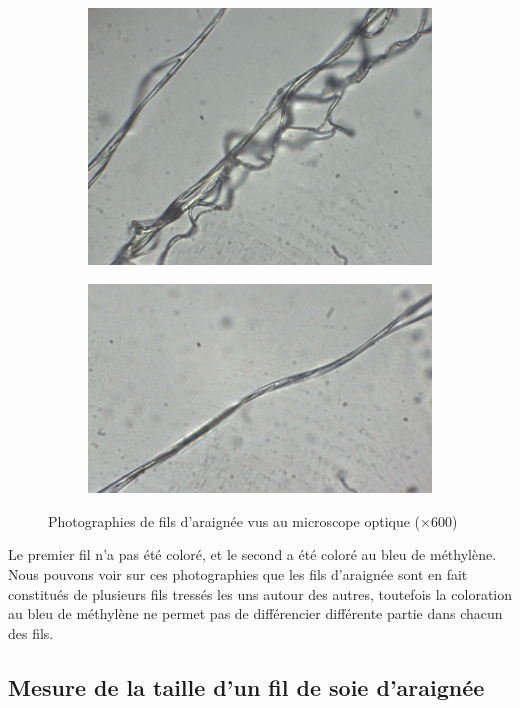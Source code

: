 	\begin{figure}[htb!]
		\centering
		\begin{subfigure}{.5\textwidth}
			\centering
			\includegraphics[width=0.8\linewidth]{../img/vibrations/FilMicroscopeA}
			\caption{}
			\label{fig:FilMicroscopeA}
		\end{subfigure}%
		\begin{subfigure}{.5\textwidth}
			\centering
			\includegraphics[width=0.8\linewidth]{../img/vibrations/FilMicroscopeB}
			\caption{}
			\label{fig:FilMicroscopeB}
		\end{subfigure}
		\caption{Photographies de fils d'araignée vus au microscope optique (×600)}
		\label{fig:test}
	\end{figure}

Le premier fil n'a pas été coloré, et le second a été coloré au bleu de
méthylène. Nous pouvons voir sur ces photographies que les fils
d'araignée sont en fait constitués de plusieurs fils tressés les uns
autour des autres, toutefois la coloration au bleu de méthylène ne
permet pas de différencier différente partie dans chacun des fils.

\subsection{Mesure de la taille d'un fil de soie d'araignée}

